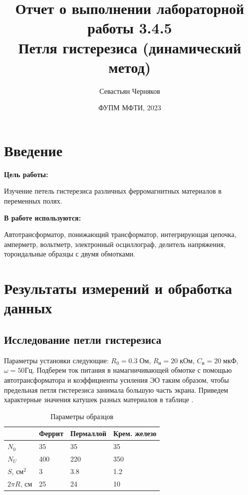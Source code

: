 \documentclass[a4paper,11pt]{extarticle} %
\title{Отчет о выполнении лабораторной работы 3.4.5 \\ 
\textbf{Петля гистерезиса (динамический метод)}}
\author{Севастьян Черняков}
\date{ ФУПМ МФТИ, 2023 \\}
\begin{document}
\maketitle 





\section{Введение}

\textbf{Цель работы:} 

	Изучение петель гистерезиса различных ферромагнитных
материалов в переменных полях.


\textbf{В работе используются:} 

Автотрансформатор, понижающий трансформатор, интегрирующая цепочка, амперметр, вольтметр, электронный
осциллограф, делитель напряжения, тороидальные образцы с двумя обмотками.





	
\section{Результаты измерений и обработка данных}


\subsection{Исследование петли гистерезиса}
Параметры установки следующие: $R_0 = 0.3 \; \text{Ом}$, $R_{\text{и}} = 20 \; \text{кОм}$, $C_{\text{и}} = 20 \; \text{мкФ}$, $\omega = 50\text{Гц}$. Подберем ток питания в намагничивающей обмотке с помощью автотрансформатора и коэффициенты усиления ЭО таким образом, чтобы предельная петля гистерезиса занимала большую часть экрана. Приведем характерные значения катушек разных материалов в таблице .


\begin{table}[h]
	\centering
	\begin{tabular}{|l|l|l|l|}
		\hline
		& Феррит & Пермаллой & Крем. железо \\ \hline
		$N_0$          & 35     & 35        & 35                \\ \hline
		$N_U$          & 400    & 220       & 350               \\ \hline
		$S$, $\text{см}^2$    & 3      & 3.8       & 1.2               \\ \hline
		$2\pi R$, $\text{см}$ & 25     & 24        & 10                \\ \hline
	\end{tabular}
	\caption{Параметры образцов}
	\label{new}
\end{table}
\end{document}
